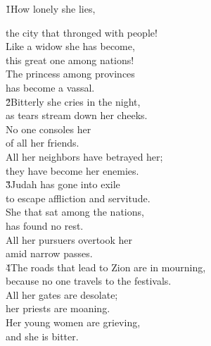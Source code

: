 


\v{1}How lonely she lies,

\begin{poetry}
\poemll    the city that thronged with people! \\
\poeml Like a widow she has become, \\
\poemll    this great one among nations! \\
\poeml The princess among provinces \\
\poemll    has become a vassal. \\
\poeml \v{2}Bitterly she cries in the night, \\
\poemll    as tears stream down her cheeks. \\
\poeml No one consoles her \\
\poemll    of all her friends. \\
\poeml All her neighbors have betrayed her; \\
\poemll    they have become her enemies. \\
\poeml \v{3}Judah has gone into exile \\
\poemll    to escape affliction and servitude. \\
\poeml She that sat among the nations, \\
\poemll    has found no rest. \\
\poeml All her pursuers overtook her \\
\poemll    amid narrow passes. \\
\poeml \v{4}The roads that lead to Zion are in mourning, \\
\poemll    because no one travels to the festivals. \\
\poeml All her gates are desolate; \\
\poemll    her priests are moaning. \\
\poeml Her young women are grieving, \\
\poemll    and she is bitter. \\

\end{poetry}
